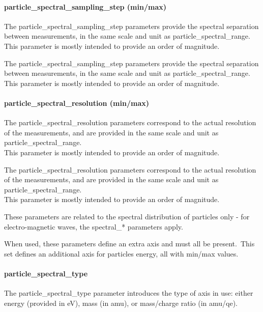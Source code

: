 \documentclass[11pt,a4paper]{ivoa}
\begin{document}
\paragraph{particle\_spectral\_sampling\_step (min/max)}

The particle\_spectral\_sampling\_step parameters provide the spectral separation between measurements, in the same scale and unit as particle\_spectral\_range.\\This parameter is mostly intended to provide an order of magnitude.

The particle\_spectral\_sampling\_step parameters provide the spectral separation between measurements, in the same scale and unit as particle\_spectral\_range.\\This parameter is mostly intended to provide an order of magnitude.

\paragraph{particle\_spectral\_resolution (min/max)}

The particle\_spectral\_resolution parameters correspond to the actual resolution of the measurements, and are provided in the same scale and unit as particle\_spectral\_range. \\This parameter is mostly intended to provide an order of magnitude.

The particle\_spectral\_resolution parameters correspond to the actual resolution of the measurements, and are provided in the same scale and unit as particle\_spectral\_range. \\This parameter is mostly intended to provide an order of magnitude.

These parameters are related to the spectral distribution of particles only - for electro-magnetic waves, the spectral\_* parameters apply.

When used, these parameters define an extra axis and must all be present. This set defines an additional axis for particles energy, all with min/max values.

\paragraph{particle\_spectral\_type}

The particle\_spectral\_type parameter introduces the type of axis in use: either energy (provided in eV), mass (in amu), or mass/charge ratio (in amu/qe).
\end{document}

